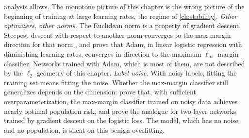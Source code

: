 \begin{refsection}
analysis allows. The monotone picture of this chapter is the wrong picture of the beginning of training at large learning rates, the regime of \cref{ch:stability}. \emph{Other optimizers, other norms.} The Euclidean norm is a property of gradient descent. Steepest descent with respect to another norm converges to the max-margin direction for that norm \parencite{GunasekarEtAl2018a}, and \textcite{ZhangZouCao2024} prove that Adam, in linear logistic regression with diminishing learning rates, converges in direction to the maximum-$\ell_\infty$-margin classifier. Networks trained with Adam, which is most of them, are not described by the $\ell_2$ geometry of this chapter. \emph{Label noise.} With noisy labels, fitting the training set means fitting the noise. Whether the max-margin classifier still generalizes depends on the dimension: \textcite{ChatterjiLong2021} prove that, with sufficient overparameterization, the max-margin classifier trained on noisy data achieves nearly optimal population risk, and \textcite{FreiChatterjiBartlett2022} prove the analogue for two-layer networks trained by gradient descent on the logistic loss. The model, which has no noise and no population, is silent on this benign overfitting.


\end{refsection}
